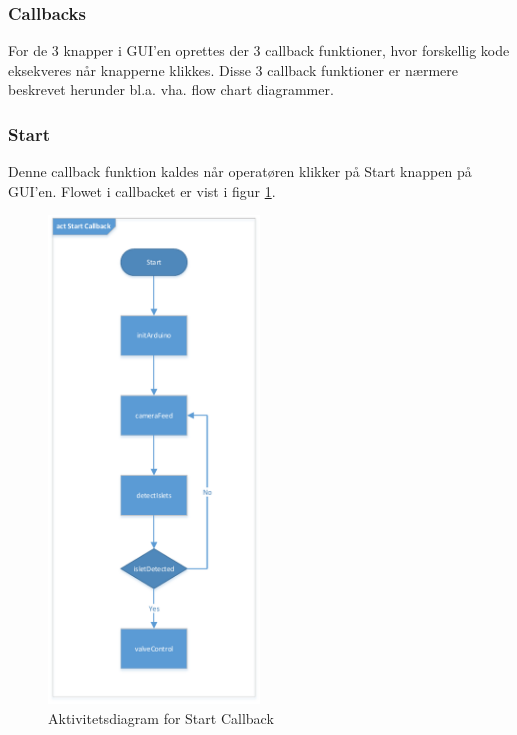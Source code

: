 \newpage
\subsubsection{Callbacks}
For de 3 knapper i GUI'en oprettes der 3 callback funktioner, hvor forskellig kode eksekveres når knapperne klikkes. Disse 3 callback funktioner er nærmere beskrevet herunder bl.a. vha. flow chart diagrammer.
\subsubsection{Start}
Denne callback funktion kaldes når operatøren klikker på Start knappen på GUI'en. Flowet i callbacket er vist i figur \ref{fig:act_start}.
\begin{figure}[H]
	\centering
	\includegraphics[width=0.5\textwidth]{billeder/act_start-crop.pdf}
	\caption{Aktivitetsdiagram for Start Callback}
	\label{fig:act_start}
\end{figure}

\newpage
